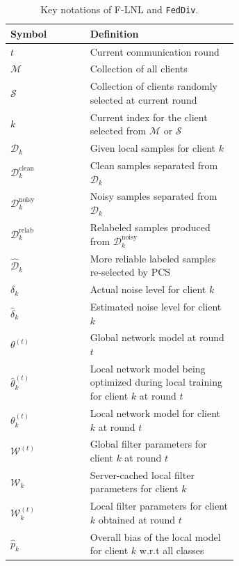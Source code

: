 \documentclass[letterpaper]{article} %
\begin{document}
\begin{table}[t]
    \centering
    \begin{tabular}{lp{0.65\linewidth}}
        \toprule
        \midrule
        \textbf{Symbol} & \textbf{Definition} \\
        \midrule
        $t$                      & Current communication round \\
        $\mathcal{M}$            & Collection of all clients \\
        $\mathcal{S}$            & Collection of clients randomly selected at current round \\
        $k$                      & Current index for the client selected from $\mathcal{M}$ or $\mathcal{S}$ \\
        $\mathcal{D}_{k}$        & Given local samples for client $k$ \\
        $\mathcal{D}_{k}^{\text{clean}}$ & Clean samples separated from $\mathcal{D}_{k}$ \\
        $\mathcal{D}_{k}^{\text{noisy}}$ & Noisy samples separated from $\mathcal{D}_{k}$ \\
        $\mathcal{D}_{k}^{\text{relab}}$ & Relabeled samples produced from $\mathcal{D}_{k}^{\text{noisy}}$ \\
        $\hat{\mathcal{D}}_{k}$  & More reliable labeled samples re-selected by PCS \\
        $\delta_{k}$             & Actual noise level for client $k$ \\
        $\hat{\delta}_{k}$       & Estimated noise level for client $k$ \\
        $\theta^{(t)}$           & Global network model at round $t$\\
        $\hat{\theta}_{k}^{(t)}$ & Local network model being optimized during local training for client $k$ at round $t$ \\
        $\theta_{k}^{(t)}$       & Local network model for client $k$ at round $t$\\
        $\mathcal{W}^{(t)}$      & Global filter parameters for client $k$ at round $t$ \\
        $\mathcal{W}_{k}$        & Server-cached local filter parameters for client $k$\\
        $\mathcal{W}_{k}^{(t)}$  & Local filter parameters for client $k$ obtained at round $t$\\
        $\hat{p}_{k}$            & Overall bias of the local model for client $k$ w.r.t all classes \\
        \bottomrule
    \end{tabular}%
    \caption{Key notations of F-LNL and \texttt{FedDiv}.}
    \label{Table:Notations}%
\end{table}%
\end{document}
